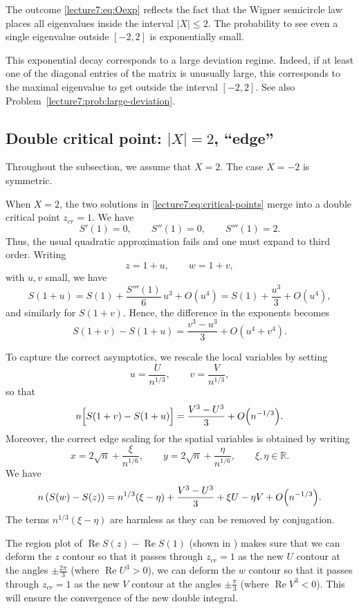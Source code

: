 \documentclass[letterpaper,11pt,oneside,reqno]{book}
\numberwithin{equation}{chapter}  %
\theoremstyle{definition}
\begin{document}
The outcome \eqref{lecture7:eq:Oexp} reflects the fact that the
Wigner semicircle law places all eigenvalues inside the
interval \(\lvert X\rvert \le 2\).
The probability to see even a single eigenvalue outside $[-2,2]$
is exponentially small.

This exponential decay corresponds to a large deviation regime.
Indeed, if at least one of the diagonal entries of the matrix
is unusually large, this corresponds to
the maximal eigenvalue to get outside the interval \([-2,2]\).
See also Problem~\ref{lecture7:prob:large-deviation}.


\subsection{Double critical point: \texorpdfstring{$|X|=2$, ``edge''}{|X|=2, edge}}
\label{lecture7:sub:double-critical-points}

Throughout the subsection, we assume that $X=2$. The case $X=-2$ is symmetric.

When \(X=2\), the two solutions in \eqref{lecture7:eq:critical-points} merge into a double critical point
$z_{cr}=1$.
We have
\[
S'(1)=0,\qquad S''(1)=0,\qquad S'''(1)=2.
\]
Thus, the usual quadratic approximation fails and one must expand to third order. Writing
\[
z=1+u,\qquad w=1+v,
\]
with \(u,v\) small, we have
\[
S(1+u)=S(1)+\frac{S'''(1)}{6}\,u^3+O(u^4)
=S(1)+\frac{u^3}{3}+O(u^4),
\]
and similarly for \(S(1+v)\). Hence, the difference in the exponents becomes
\[
S(1+v)-S(1+u)=\frac{v^3-u^3}{3}+O(u^4+v^4).
\]

To capture the correct asymptotics, we rescale the local variables by setting
\[
u=\frac{U}{n^{1/3}},\qquad v=\frac{V}{n^{1/3}},
\]
so that
\[
n\Bigl[S(1+v)-S(1+u)\Bigr]=\frac{V^3-U^3}{3}+O\Bigl(n^{-1/3}\Bigr).
\]
Moreover, the correct edge scaling for the spatial variables is obtained by writing
\[
x=2\sqrt{n}+\frac{\xi}{n^{1/6}},\qquad y=2\sqrt{n}+\frac{\eta}{n^{1/6}},\qquad \xi,\eta\in\mathbb{R}.
\]
We have
\begin{equation*}
	n\left( S(w)-S(z) \right)=n^{1/3}(\xi-\eta)+
	\frac{V^3-U^3}{3}+\xi U-\eta V+O\Bigl(n^{-1/3}\Bigr).
\end{equation*}
The terms $n^{1/3}(\xi-\eta)$ are harmless as they can be removed
by conjugation.

The region plot of $\operatorname{Re}S(z)-\operatorname{Re}S(1)$
(shown in )
makes sure that we can deform the $z$ contour so that it passes through $z_{cr}=1$
as the new $U$ contour at the angles $\pm \frac{2\pi}{3}$ (where $\operatorname{Re}U^3>0$),
we can deform the $w$ contour so that it passes through $z_{cr}=1$
as the new $V$ contour at the angles $\pm \frac{\pi}{3}$ (where $\operatorname{Re}V^3<0$).
This will ensure the convergence of the new double integral.
\end{document}
